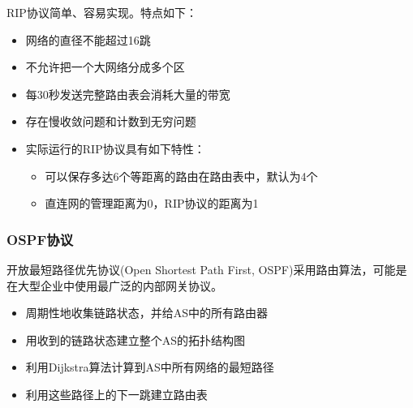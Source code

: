 \myhline
RIP协议简单、容易实现。特点如下：
\begin{itemize}
\item 网络的直径不能超过16跳
\item 不允许把一个大网络分成多个区
\item 每30秒发送完整路由表会消耗大量的带宽
\item 存在慢收敛问题和计数到无穷问题
\item 实际运行的RIP协议具有如下特性：
\begin{itemize}
\item 可以保存多达6个等距离的路由在路由表中，默认为4个
\item 直连网的管理距离为0，RIP协议的距离为1
\end{itemize}
\end{itemize}

\subsubsection{OSPF协议}
开放最短路径优先协议(Open Shortest Path First, OSPF)采用路由算法，可能是在大型企业中使用最广泛的内部网关协议。
\begin{itemize}
\item 周期性地收集链路状态，并给AS中的所有路由器
\item 用收到的链路状态建立整个AS的拓扑结构图
\item 利用Dijkstra算法计算到AS中所有网络的最短路径
\item 利用这些路径上的下一跳建立路由表
\end{itemize}

